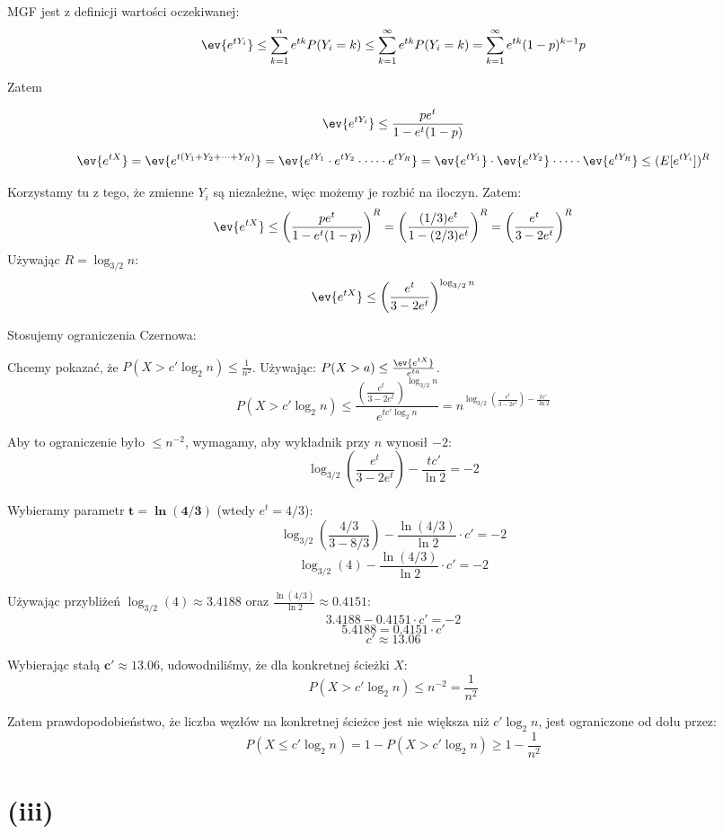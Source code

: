 MGF jest z definicji wartości oczekiwanej:
\[ \ev{e^{tY_i}} \le \sum_{k=1}^{n} e^{tk} P(Y_i = k) \le  \sum_{k=1}^{\infty} e^{tk} P(Y_i = k) =  \sum_{k=1}^{\infty} e^{tk} (1-p)^{k-1} p\]

Zatem

\[\ev{e^{tY_i}}  \le  \frac{p e^t}{1 - e^t(1-p)}\]


\[
	\ev{e^{tX}} = \ev{e^{t(Y_1 + Y_2 + \dots + Y_R)}} = \ev{e^{tY_1} \cdot e^{tY_2} \cdot \dots \cdot e^{tY_R}} \quad \\
	= \ev{e^{tY_1}} \cdot \ev{e^{tY_2}} \cdot \dots \cdot \ev{e^{tY_R}}  \le (E[e^{tY_i}])^R
\]

Korzystamy tu z tego, że zmienne \(Y_{i}\) są niezależne, więc możemy je rozbić na iloczyn. Zatem:
\[\ev{e^{tX}} \le \left(\frac{p e^t}{1 - e^t(1-p)}\right)^R =  \left(\frac{(1/3) e^t}{1 - (2/3)e^t}\right)^R = \left(\frac{e^t}{3 - 2e^t}\right)^R\]
Używając \(R = \log_{3/2} n \):
\[\ev{e^{tX}} \le \left(\frac{e^t}{3 - 2e^t}\right)^{\log_{3/2} n}\]

Stosujemy ograniczenia Czernowa:

Chcemy pokazać, że \(P(X > c' \log_2 n) \le \frac{1}{n^2}\).
Używając: \(P(X > a) \le \frac{\ev{e^{tX}}}{e^{ta}}\).
\[P(X > c' \log_2 n) \le \frac{\left(\frac{e^t}{3 - 2e^t}\right)^{\log_{3/2} n}}{e^{t c' \log_2 n}} = n^{\log_{3/2}\left(\frac{e^t}{3 - 2e^t}\right) - \frac{t c'}{\ln 2}}\]

Aby to ograniczenie było \(\le n^{-2}\), wymagamy, aby wykładnik przy \(n\) wynosił \(-2\):
\[\log_{3/2}\left(\frac{e^t}{3 - 2e^t}\right) - \frac{t c'}{\ln 2} = -2\]

Wybieramy parametr \(\mathbf{t = \ln(4/3)}\) (wtedy \(e^t = 4/3\)):
\[\log_{3/2}\left(\frac{4/3}{3 - 8/3}\right) - \frac{\ln(4/3)}{\ln 2} \cdot c' = -2\]
\[\log_{3/2}(4) - \frac{\ln(4/3)}{\ln 2} \cdot c' = -2\]

Używając przybliżeń \(\log_{3/2}(4) \approx 3.4188\) oraz \(\frac{\ln(4/3)}{\ln 2} \approx 0.4151\):
\[3.4188 - 0.4151 \cdot c' = -2\]
\[5.4188 = 0.4151 \cdot c'\]
\[c' \approx \mathbf{13.06}\]


Wybierając stałą \(\mathbf{c' \approx 13.06}\), udowodniliśmy, że dla konkretnej ścieżki \(X\):
\[P(X > c' \log_2 n) \le n^{-2} = \frac{1}{n^2}\]

Zatem prawdopodobieństwo, że liczba węzłów na konkretnej ścieżce jest nie większa niż \(c' \log_2 n\), jest ograniczone od dołu przez:
\[P(X \le c' \log_2 n) = 1 - P(X > c' \log_2 n) \ge 1 - \frac{1}{n^2}\]
\section*{(iii)}


